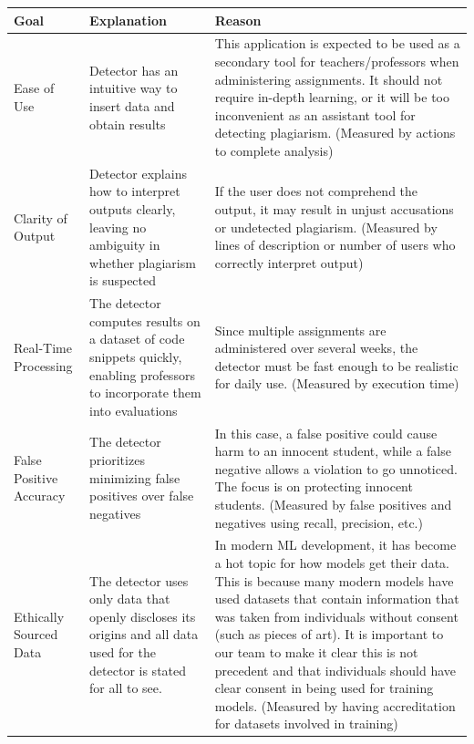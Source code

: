 \documentclass[12pt]{article}
\begin{document}
\begin{center}
    \begin{longtable}{ | p{3cm} | p{6cm} | p{6cm} | }
    \hline
    Goal & Explanation & Reason \\
    \hline
    Ease of Use & Detector has an intuitive way to insert data and obtain results &
    This application is expected to be used as a secondary tool for
    teachers/professors when administering assignments. It should not require
    in-depth learning, or it will be too inconvenient as an assistant tool for
    detecting plagiarism. (Measured by actions to complete analysis)\\
    \hline
    Clarity of Output & Detector explains how to interpret outputs clearly, leaving
    no ambiguity in whether plagiarism is suspected & If the user does not
    comprehend the output, it may result in unjust accusations or undetected
    plagiarism. (Measured by lines of description or number of users who correctly
    interpret output)\\
    \hline
    Real-Time Processing & The detector computes results on a dataset of code
    snippets quickly, enabling professors to incorporate them into evaluations &
    Since multiple assignments are administered over several weeks, the detector
    must be fast enough to be realistic for daily use. (Measured by execution
    time)\\
    \hline
    False Positive Accuracy & The detector prioritizes minimizing false positives over
    false negatives & In this case, a false positive could cause harm to an innocent
    student, while a false negative allows a violation to go unnoticed. The focus is
    on protecting innocent students. (Measured by false positives and negatives
    using recall, precision, etc.)\\
    \hline
    Ethically Sourced Data & The detector uses only data that openly discloses its 
    origins and all data used for the detector is stated for all to see. & In 
    modern ML development, it has become a hot topic for how models get their data.
    This is because many modern models have used datasets that contain information
    that was taken from individuals without consent (such as pieces of art). It is
    important to our team to make it clear this is not precedent and that 
    individuals should have clear consent in being used for training models. 
    (Measured by having accreditation for datasets involved in training)\\
    \hline
    \end{longtable}
    \end{center}
    
\end{document}
